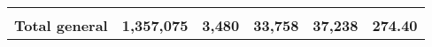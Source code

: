 \begin{tabular}{lrcclr}
	& \multicolumn{1}{l}{}                                           & \multicolumn{1}{l}{}                                       & \multicolumn{1}{l}{} &                                                                     & \multicolumn{1}{l}{}                                                         \\
	\rowcolor[HTML]{DDEBF7} 
	\textbf{Total   general}                                       & \textbf{1,357,075}                                             & \multicolumn{1}{r}{\cellcolor[HTML]{DDEBF7}\textbf{3,480}} & \textbf{33,758}      & \textbf{37,238}                                                     & \textbf{274.40}                                                             
\end{tabular}